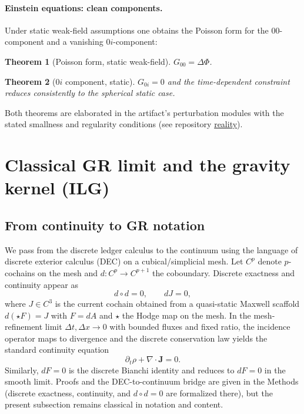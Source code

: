 \documentclass[11pt]{article}
\newtheorem{theorem}{Theorem}[section]
\begin{document}
\paragraph{Einstein equations: clean components.}
Under static weak-field assumptions one obtains the Poisson form for the $00$-component and a vanishing $0i$-component:\vspace{-0.25em}
\begin{theorem}[Poisson form, static weak-field]
$G_{00} = \Delta\Phi$.
\end{theorem}
\begin{theorem}[$0i$ component, static]
$G_{0i}=0$ and the time-dependent constraint reduces consistently to the spherical static case.
\end{theorem}
Both theorems are elaborated in the artifact's perturbation modules with the stated smallness and regularity conditions (see repository \href{https://github.com/jonwashburn/reality}{reality}).


\section{Classical GR limit and the gravity kernel (ILG)}\label{sec:ilg}

\subsection{From continuity to GR notation}
We pass from the discrete ledger calculus to the continuum using the language of discrete exterior calculus (DEC) on a cubical/simplicial mesh. Let $C^p$ denote $p$-cochains on the mesh and $d:C^p\to C^{p+1}$ the coboundary. Discrete exactness and continuity appear as
\begin{equation}
d\circ d=0, \qquad dJ=0,
\end{equation}
where $J\in C^3$ is the current cochain obtained from a quasi-static Maxwell scaffold $d(\star F)=J$ with $F=dA$ and $\star$ the Hodge map on the mesh. In the mesh-refinement limit $\Delta t,\Delta x\to 0$ with bounded fluxes and fixed ratio, the incidence operator maps to divergence and the discrete conservation law yields the standard continuity equation
\begin{equation}
\partial_t\rho+\nabla\!\cdot\! \mathbf{J}=0.
\end{equation}
Similarly, $dF=0$ is the discrete Bianchi identity and reduces to $dF=0$ in the smooth limit. Proofs and the DEC-to-continuum bridge are given in the Methods (discrete exactness, continuity, and $d\circ d=0$ are formalized there), but the present subsection remains classical in notation and content.
\end{document}
